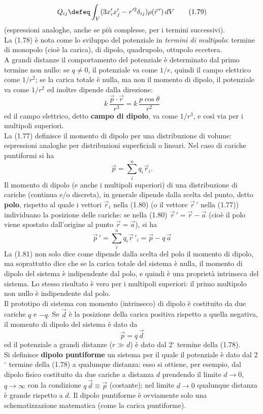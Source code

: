 \begin{equation}
Q_{ij}\defeq\int_V(3x'_ix'_j-r'^2\delta_{ij})\rho(\vec r\,')\,dV
\tag{1.79}
\end{equation}
(espressioni analoghe, anche se più complesse, per i termini successivi).\\
La (1.78) è nota come lo sviluppo del potenziale in \emph{termini di multipolo}: termine di monopolo (cioè la carica), di dipolo, quadrupolo, ottupolo eccetera.\\
A grandi distanze il comportamento del potenziale è determinato dal primo termine non nullo: se $q\neq0$, il potenziale va come $1/r$, quindi il campo elettrico come $1/r^2$; se la carica totale è nulla, ma non il momento di dipolo, il potenziale va come $1/r^2$ ed inoltre dipende dalla direzione:
\[
k\,\frac{\vec p\cdot\vec r}{r^3}=k\,\frac{p\cos\theta}{r^2}
\]
ed il campo elettrico, detto \textbf{campo di dipolo}, va come $1/r^3$, e così via per i multipoli superiori.\\
La (1.77) definisce il momento di dipolo per una distribuzione di volume: espressioni analoghe per distribuzioni superficiali o lineari. Nel caso di cariche puntiformi si ha
\begin{equation}
\vec p=\sum_i^nq_i\vec r_i.
\tag{1.80}
\end{equation}
Il momento di dipolo (e anche i multipoli superiori) di una distribuzione di cariche (continua e/o discreta), in generale dipende dalla scelta del punto, detto \textbf{polo}, rispetto al quale i vettori $\vec r_i$ nella (1.80) \big(o il vettore $\vec r\,'$ nella (1.77)\big) individuano la posizione delle cariche: se nella (1.80) $\vec r\,'=\vec r-\vec a$ (cioè il polo viene spostato dall'origine al punto $\vec r=\vec a$), si ha
\begin{equation}
\vec p\,'=\sum_i^nq_i\vec r\,'_i=\vec p-q\,\vec a
\tag{1.81}
\end{equation}
La (1.81) non solo dice come dipende dalla scelta del polo il momento di dipolo, ma soprattutto dice che se la carica totale del sistema è nulla, il momento di dipolo del sistema è indipendente dal polo, e quindi è una proprietà intrinseca del sistema. Lo stesso risultato è vero per i multipoli superiori: il primo multipolo non nullo è indipendente dal polo.\\
Il prototipo di sistema con momento (intrinseco) di dipolo è costituito da due cariche $q$ e $-q$. Se $\vec d$ è la posizione della carica positiva rispetto a quella negativa, il momento di dipolo del sistema è dato da
\begin{equation}
\vec p=q\,\vec d
\tag{1.82}
\end{equation}
ed il potenziale a grandi distanze ($r\gg d$) è dato dal 2$^\circ$ termine della (1.78).\\
Si definisce \textbf{dipolo puntiforme} un sistema per il quale il potenziale è dato dal 2$^\circ$ termine della (1.78) a qualunque distanza: esso si ottiene, per esempio, dal dipolo fisico costituito da due cariche a distanza $d$ prendendo il limite $d\to0$, $q\to\infty$ con la condizione $q\,\vec d\equiv\vec p$ (costante); nel limite $d\to0$ qualunque distanza è grande rispetto a $d$. Il dipolo puntiforme è ovviamente solo una schematizzazione matematica (come la carica puntiforme).

